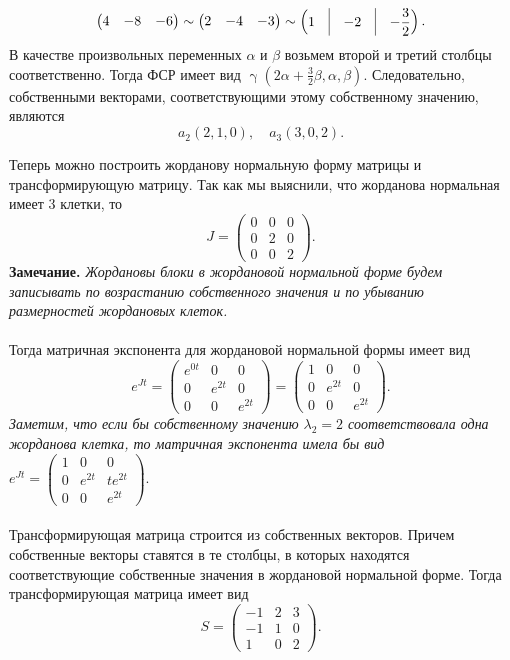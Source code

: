 \documentclass[a4paper, 12pt]{article}
\begin{document}
\begin{enumerate}
$$\begin{pmatrix}
4 & -8 & -6
\end{pmatrix}\sim \begin{pmatrix}
2 & -4 & -3\\
\end{pmatrix}\sim \begin{pmatrix}
1 &\vline & -2 &\vline& -\dfrac{3}{2}\\
\end{pmatrix}.$$
В качестве произвольных переменных $\alpha$ и $\beta$ возьмем второй и третий столбцы соответственно. Тогда ФСР имеет вид $\upgamma(2\alpha + \frac{3}{2}\beta, \alpha, \beta)$. Следовательно, собственными векторами, соответствующими этому собственному значению, являются $$a_2(2,1,0),\quad a_3(3,0,2).$$
\end{enumerate}
Теперь можно построить жорданову нормальную форму матрицы и трансформирующую матрицу. Так как мы выяснили, что жорданова нормальная имеет 3 клетки, то $$J = \begin{pmatrix}
	0 & 0 & 0\\
	0 & 2 & 0\\
	0 & 0 & 2
\end{pmatrix}.$$
\textbf{Замечание.} \textit{Жордановы блоки в жордановой нормальной форме будем записывать по возрастанию собственного значения и по убыванию размерностей жордановых клеток.}\\\\
Тогда матричная экспонента для жордановой нормальной формы имеет вид $$e^{Jt} = \begin{pmatrix}
	e^{0t} & 0 & 0\\
	0 & e^{2t} & 0\\
	0 & 0 & e^{2t}
\end{pmatrix} = \begin{pmatrix}
1 & 0 & 0\\
0 & e^{2t} & 0\\
0 & 0 & e^{2t}
\end{pmatrix}.$$
\textit{Заметим, что если бы собственному значению $\lambda_2 = 2$ соответствовала одна жорданова клетка, то матричная экспонента имела бы вид} $e^{Jt} =\begin{pmatrix}
	1 & 0 & 0\\
	0 & e^{2t} & te^{2t}\\
	0 & 0 & e^{2t}
\end{pmatrix}.$\\\\
Трансформирующая матрица строится из собственных векторов. Причем собственные векторы ставятся в те столбцы, в которых находятся соответствующие собственные значения в жордановой нормальной форме. Тогда трансформирующая матрица имеет вид $$S = \begin{pmatrix}
	-1 & 2 & 3\\
	-1 & 1 & 0\\
	1 & 0 & 2
\end{pmatrix}.$$
\end{document}
